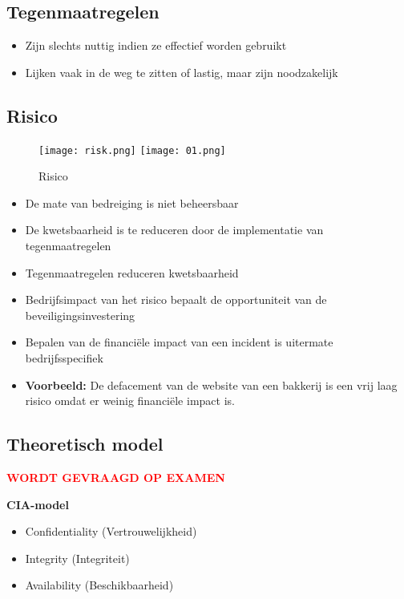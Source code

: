 \documentclass{article}
\newcommand{\bold}[1]{\textbf{#1}}
\begin{document}
\subsection{Tegenmaatregelen}
\begin{itemize}
    \item Zijn slechts nuttig indien ze effectief worden gebruikt
    \item Lijken vaak in de weg te zitten of lastig, maar zijn noodzakelijk
\end{itemize}

\subsection{Risico}

\begin{figure}[H]
    \centering
    \texttt{[image: risk.png]}
    \texttt{[image: 01.png]}
    \caption{Risico}
\end{figure}


\begin{itemize}
    \item De mate van bedreiging is niet beheersbaar
    \item De kwetsbaarheid is te reduceren door de implementatie van tegenmaatregelen
    \item Tegenmaatregelen reduceren kwetsbaarheid
    \item Bedrijfsimpact van het risico bepaalt de opportuniteit van de beveiligingsinvestering
    \item Bepalen van de financiële impact van een incident is uitermate bedrijfsspecifiek
    \item \bold{Voorbeeld:} De defacement van de website van een bakkerij is een vrij laag risico omdat er weinig financiële impact is.
\end{itemize}

\subsection{Theoretisch model}
\textcolor{red}{\bold{WORDT GEVRAAGD OP EXAMEN}}

\bold{CIA-model}

\begin{itemize}
    \item Confidentiality (Vertrouwelijkheid)
    \item Integrity (Integriteit)
    \item Availability (Beschikbaarheid)
\end{itemize}
\end{document}
